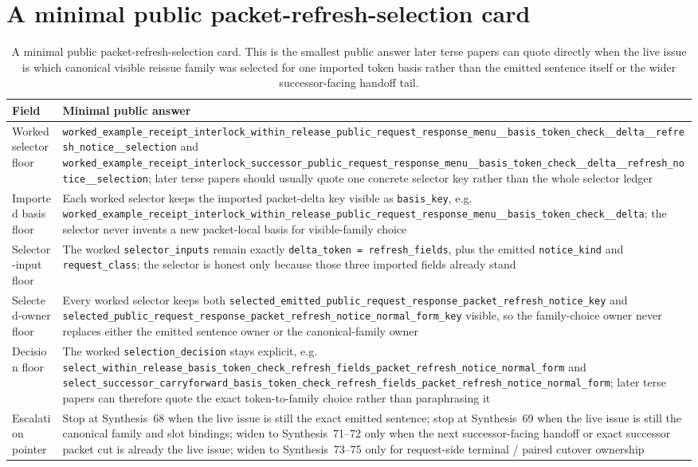 \documentclass[11pt]{article}
\begin{document}
\section{A minimal public packet-refresh-selection card}
\begin{table}[t]
\centering
\small
\begin{tabularx}{\linewidth}{@{}lX@{}}
\toprule
Field & Minimal public answer \\
\midrule
Worked selector floor & \nolinkurl{worked_example_receipt_interlock_within_release_public_request_response_menu__basis_token_check__delta__refresh_notice__selection} and \nolinkurl{worked_example_receipt_interlock_successor_public_request_response_menu__basis_token_check__delta__refresh_notice__selection}; later terse papers should usually quote one concrete selector key rather than the whole selector ledger \\
Imported basis floor & Each worked selector keeps the imported packet-delta key visible as \nolinkurl{basis_key}, e.g. \nolinkurl{worked_example_receipt_interlock_within_release_public_request_response_menu__basis_token_check__delta}; the selector never invents a new packet-local basis for visible-family choice \\
Selector-input floor & The worked \nolinkurl{selector_inputs} remain exactly \nolinkurl{delta_token = refresh_fields}, plus the emitted \nolinkurl{notice_kind} and \nolinkurl{request_class}; the selector is honest only because those three imported fields already stand \\
Selected-owner floor & Every worked selector keeps both \nolinkurl{selected_emitted_public_request_response_packet_refresh_notice_key} and \nolinkurl{selected_public_request_response_packet_refresh_notice_normal_form_key} visible, so the family-choice owner never replaces either the emitted sentence owner or the canonical-family owner \\
Decision floor & The worked \nolinkurl{selection_decision} stays explicit, e.g. \nolinkurl{select_within_release_basis_token_check_refresh_fields_packet_refresh_notice_normal_form} and \nolinkurl{select_successor_carryforward_basis_token_check_refresh_fields_packet_refresh_notice_normal_form}; later terse papers can therefore quote the exact token-to-family choice rather than paraphrasing it \\
Escalation pointer & Stop at Synthesis~68 when the live issue is still the exact emitted sentence; stop at Synthesis~69 when the live issue is still the canonical family and slot bindings; widen to Synthesis~71--72 only when the next successor-facing handoff or exact successor packet cut is already the live issue; widen to Synthesis~73--75 only for request-side terminal / paired cutover ownership \\
\bottomrule
\end{tabularx}
\caption{A minimal public packet-refresh-selection card. This is the smallest public answer later terse papers can quote directly when the live issue is which canonical visible reissue family was selected for one imported token basis rather than the emitted sentence itself or the wider successor-facing handoff tail.}
\label{tab:minimal-public-packet-refresh-selection-card}
\end{table}
\end{document}
